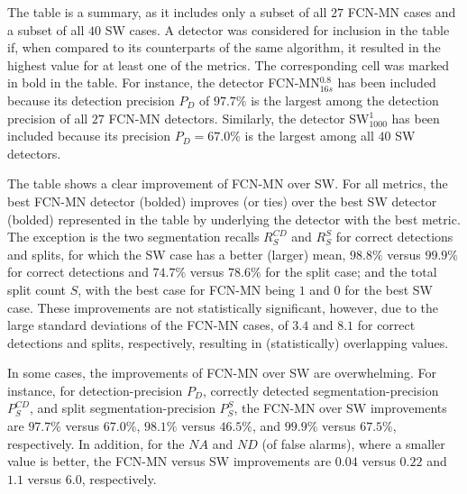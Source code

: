\documentclass[a4paper,authoryear,review]{elsarticle}
\begin{document}
	The table is a summary, as it includes only a subset of all $27$ FCN-MN cases and a subset of all $40$ SW cases. A detector was considered for inclusion in the table if, when compared to its counterparts of the same algorithm, it resulted in the highest value for at least one of the metrics. The corresponding cell was marked in bold in the table. For instance, the detector FCN-MN$_{16s}^{0.8}$ has been included because its detection precision $P_D$ of $97.7\%$ is the largest among the detection precision of all $27$ FCN-MN detectors. Similarly, the detector SW$_{1000}^1$ has been included because its precision $P_D = 67.0\%$ is the largest among all $40$ SW detectors. 
	
	The table shows a clear improvement of FCN-MN over SW. For all metrics, the best  FCN-MN detector (bolded) improves (or ties) over the best SW detector (bolded) represented in the table by underlying the detector with the best metric. The exception is the two segmentation recalls $R_S^{CD}$ and $R_S^{S}$ for correct detections and splits, for which the SW case has a better (larger) mean, $98.8\%$ versus $99.9\%$ for correct detections and $74.7\%$ versus $78.6\%$ for the split case; and the total split count $S$, with the best case for FCN-MN being $1$ and $0$ for the best SW case. These improvements are not statistically significant, however, due to the large standard deviations of the FCN-MN cases, of $3.4$ and $8.1$ for correct detections and splits, respectively,  resulting in (statistically) overlapping values. 
	
	In some cases, the improvements of FCN-MN over SW are overwhelming. For instance, for detection-precision $P_D$, correctly detected segmentation-precision $P_S^{CD}$, and split segmentation-precision $P_S^{S}$, the FCN-MN over SW improvements are $97.7\%$ versus $67.0\%$, $98.1\%$ versus $46.5\%$, and $99.9\%$ versus $67.5\%$, respectively.  In addition, for the $NA$ and $ND$ (of false alarms), where a smaller value is better, the  FCN-MN versus SW improvements are $0.04$ versus $0.22$ and $1.1$ versus $6.0$, respectively. 
	
\end{document}
